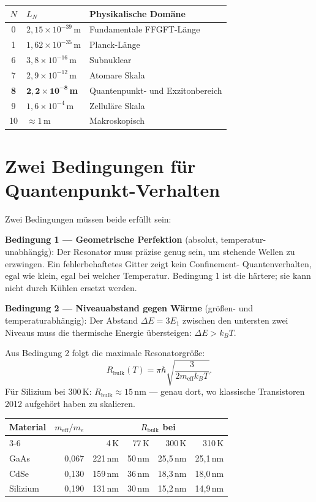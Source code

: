 \begin{center}
\small
\begin{tabular}{cll}
\toprule
$N$ & $L_N$ & Physikalische Domäne \\
\midrule
0 & $2{,}15\times10^{-39}$\,m & Fundamentale FFGFT-Länge \\
1 & $1{,}62\times10^{-35}$\,m & Planck-Länge \\
6 & $3{,}8\times10^{-16}$\,m & Subnuklear \\
7 & $2{,}9\times10^{-12}$\,m & Atomare Skala \\
\textbf{8} & $\mathbf{2{,}2\times10^{-8}}$\,\textbf{m} & Quantenpunkt- und Exzitonbereich \\
9 & $1{,}6\times10^{-4}$\,m & Zelluläre Skala \\
10 & $\approx1$\,m & Makroskopisch \\
\bottomrule
\end{tabular}
\end{center}

\section{Zwei Bedingungen für Quantenpunkt-Verhalten}

Zwei Bedingungen müssen beide erfüllt sein:

\textbf{Bedingung 1 --- Geometrische Perfektion} (absolut, temperatur-
unabhängig): Der Resonator muss präzise genug sein, um stehende Wellen
zu erzwingen. Ein fehlerbehaftetes Gitter zeigt kein Confinement-
Quantenverhalten, egal wie klein, egal bei welcher Temperatur. Bedingung 1
ist die härtere; sie kann nicht durch Kühlen ersetzt werden.

\textbf{Bedingung 2 --- Niveauabstand gegen Wärme} (größen- und
temperaturabhängig): Der Abstand $\Delta E = 3E_1$ zwischen den untersten
zwei Niveaus muss die thermische Energie übersteigen: $\Delta E > k_BT$.

Aus Bedingung 2 folgt die maximale Resonatorgröße:
\begin{equation}
  R_{\mathrm{bulk}}(T) = \pi\hbar\sqrt{\frac{3}{2m_{\mathrm{eff}}k_BT}}.
\end{equation}
Für Silizium bei 300\,K: $R_{\mathrm{bulk}}\approx15$\,nm --- genau dort,
wo klassische Transistoren 2012 aufgehört haben zu skalieren.

\begin{center}
\small
\begin{tabular}{lrrrrr}
\toprule
\textbf{Material} & $m_{\mathrm{eff}}/m_e$ & \multicolumn{4}{c}{$R_{\mathrm{bulk}}$ bei} \\
\cmidrule(lr){3-6}
 & & 4\,K & 77\,K & 300\,K & 310\,K \\
\midrule
GaAs & 0{,}067 & 221\,nm & 50\,nm & 25{,}5\,nm & 25{,}1\,nm \\
CdSe & 0{,}130 & 159\,nm & 36\,nm & 18{,}3\,nm & 18{,}0\,nm \\
Silizium & 0{,}190 & 131\,nm & 30\,nm & 15{,}2\,nm & 14{,}9\,nm \\
\bottomrule
\end{tabular}
\end{center}

